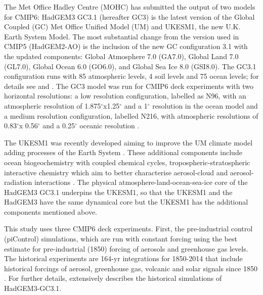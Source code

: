 The Met Office Hadley Centre (MOHC) has submitted the output of two models for CMIP6: HadGEM3 GC3.1 
(hereafter GC3) is the latest version of the Global Coupled (GC) Met Office Unified Model (UM) and UKESM1, the new U.K. Earth System Model.
The most substantial change from the version used in CMIP5 (HadGEM2-AO) is the inclusion of the new GC configuration 3.1 \citep{walters2019} with the updated components: Global Atmosphere 7.0 (GA7.0), Global Land 7.0
(GL7.0), Global Ocean 6.0 (GO6.0), and Global Sea Ice 8.0 (GSI8.0).
The GC3.1 configuration runs with 85 atmospheric levels, 4 soil levels and 75 ocean levels; for details see \cite{williams2018} and \cite{kuhlbrodt2018}.
The GC3 model was run for CMIP6 deck experiments with two horizontal resolutions: a low resolution configuration, labelled as N96, with an atmospheric resolution of 1.875$^\circ$x1.25$^\circ$ and a 1$^\circ$ resolution in the ocean model and a medium resolution configuration, labelled N216, with atmospheric resolutions of 0.83$^\circ$x 0.56$^\circ$ and a 0.25$^\circ$ oceanic resolution \citep{menary2018}.

The UKESM1 was recently developed aiming to improve the UM climate model adding processes of the Earth System \citep{sellar2019}. These additional components include ocean biogeochemistry with coupled chemical cycles, tropospheric-stratospheric interactive chemistry which aim to better characterise aerosol-cloud and aerosol-radiation interactions \citep{mulcahy2018,sellar2019}.
The physical atmosphere-land-ocean-sea-ice core of the HadGEM3 GC3.1 underpins the UKESM1, so that the UKESM1 and the HadGEM3 have the same dynamical core but the UKESM1 has the additional components mentioned above.



This study uses three CMIP6 deck experiments. First, the pre-industrial control (piControl) simulations, which are run with constant forcing using the best estimate for pre-industrial (1850) forcing of aerosols and greenhouse gas levels. 
The historical experiments are 164-yr integrations for 1850-2014 that include historical forcings of aerosol, greenhouse gas, volcanic and solar signals since 1850 \citep{eyring2016,andrews2019}. For further details, \cite{andrews2020} extensively describes the historical simulations of HadGEM3-GC3.1. %

